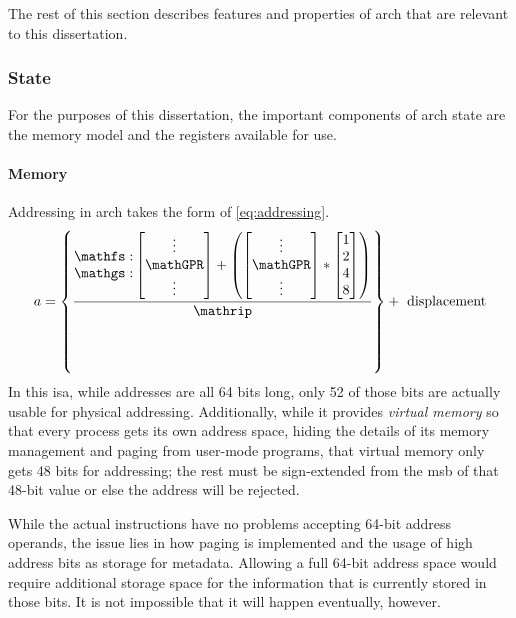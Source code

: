 The rest of this section describes features and properties of \gls{arch} that are relevant
to this dissertation.

\subsubsection{State}
For the purposes of this dissertation,
the important components of \gls{arch} state are the memory model
and the registers available for use.

\paragraph{Memory}
Addressing in \gls{arch} takes the form of \cref{eq:addressing}.
\begin{equation}\label{eq:addressing}
a = \left\{\frac{\begin{matrix}
  \mathfs: \\ \mathgs:
  \end{matrix}\begin{bmatrix}
  \vdots \\ \mathGPR \\ \vdots
  \end{bmatrix}+\left(
  \begin{bmatrix}
  \vdots \\ \mathGPR \\ \vdots
  \end{bmatrix}*\begin{bmatrix}
  1 \\ 2 \\ 4 \\ 8
  \end{bmatrix}
  \right)}{\mathrip}\right\}+\text{ displacement}
\end{equation}
In this \ac{isa}, while addresses are all 64 bits long,
only 52 of those bits are actually usable for physical addressing.
Additionally, while it provides \emph{virtual memory}
so that every process gets its own  address space,
hiding the details of its memory management and paging
from user-mode programs, that virtual memory only gets 48 bits for addressing;
the rest must be sign-extended from the \ac{msb} of that 48-bit value
or else the address will be rejected.

While the actual instructions have no problems accepting 64-bit address operands,
the issue lies in how paging is implemented and the usage of high address bits
as storage for metadata. Allowing a full 64-bit address space would require additional
storage space for the information that is currently stored in those bits.
It is not impossible that it will happen eventually, however.

